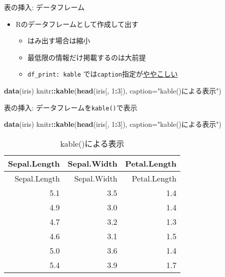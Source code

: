 \documentclass[
  12pt,
  ignorenonframetext,
]{beamer}
\newenvironment{Shaded}{\begin{snugshade}}{\end{snugshade}}
\newcommand{\DataTypeTok}[1]{\textcolor[rgb]{0.13,0.29,0.53}{#1}}
\newcommand{\DecValTok}[1]{\textcolor[rgb]{0.00,0.00,0.81}{#1}}
\newcommand{\KeywordTok}[1]{\textcolor[rgb]{0.13,0.29,0.53}{\textbf{#1}}}
\newcommand{\NormalTok}[1]{#1}
\newcommand{\OperatorTok}[1]{\textcolor[rgb]{0.81,0.36,0.00}{\textbf{#1}}}
\newcommand{\StringTok}[1]{\textcolor[rgb]{0.31,0.60,0.02}{#1}}
\providecommand{\tightlist}{%
  \setlength{\itemsep}{0pt}\setlength{\parskip}{0pt}}
\begin{document}
\begin{frame}[fragile]{表の挿入: データフレーム}
\protect\hypertarget{ux8868ux306eux633fux5165-ux30c7ux30fcux30bfux30d5ux30ecux30fcux30e0}{}

\begin{itemize}
\tightlist
\item
  Rのデータフレームとして作成して出す

  \begin{itemize}
  \tightlist
  \item
    はみ出す場合は縮小
  \item
    最低限の情報だけ掲載するのは大前提
  \item
    \texttt{df\_print:\ kable}
    では\texttt{caption}指定が\href{https://stackoverflow.com/questions/48410861/how-to-add-table-caption-using-df-print}{ややこしい}
  \end{itemize}
\end{itemize}

\begin{Shaded}
\begin{Highlighting}[]
\KeywordTok{data}\NormalTok{(iris)}
\NormalTok{knitr}\OperatorTok{::}\KeywordTok{kable}\NormalTok{(}\KeywordTok{head}\NormalTok{(iris[, }\DecValTok{1}\OperatorTok{:}\DecValTok{3}\NormalTok{]),}
             \DataTypeTok{caption=}\StringTok{"kable()による表示"}\NormalTok{)}
\end{Highlighting}
\end{Shaded}

\end{frame}

\begin{frame}[fragile]{表の挿入: データフレームを\texttt{kable()}で表示}
\protect\hypertarget{ux8868ux306eux633fux5165-ux30c7ux30fcux30bfux30d5ux30ecux30fcux30e0ux3092kableux3067ux8868ux793a}{}

\begin{Shaded}
\begin{Highlighting}[]
\KeywordTok{data}\NormalTok{(iris)}
\NormalTok{knitr}\OperatorTok{::}\KeywordTok{kable}\NormalTok{(}\KeywordTok{head}\NormalTok{(iris[, }\DecValTok{1}\OperatorTok{:}\DecValTok{3}\NormalTok{]),}
             \DataTypeTok{caption=}\StringTok{"kable()による表示"}\NormalTok{)}
\end{Highlighting}
\end{Shaded}

\begin{longtable}[]{@{}rrr@{}}
\caption{kable()による表示}\tabularnewline
\toprule
Sepal.Length & Sepal.Width & Petal.Length\tabularnewline
\midrule
\endfirsthead
\toprule
Sepal.Length & Sepal.Width & Petal.Length\tabularnewline
\midrule
\endhead
5.1 & 3.5 & 1.4\tabularnewline
4.9 & 3.0 & 1.4\tabularnewline
4.7 & 3.2 & 1.3\tabularnewline
4.6 & 3.1 & 1.5\tabularnewline
5.0 & 3.6 & 1.4\tabularnewline
5.4 & 3.9 & 1.7\tabularnewline
\bottomrule
\end{longtable}

\end{frame}
\end{document}
